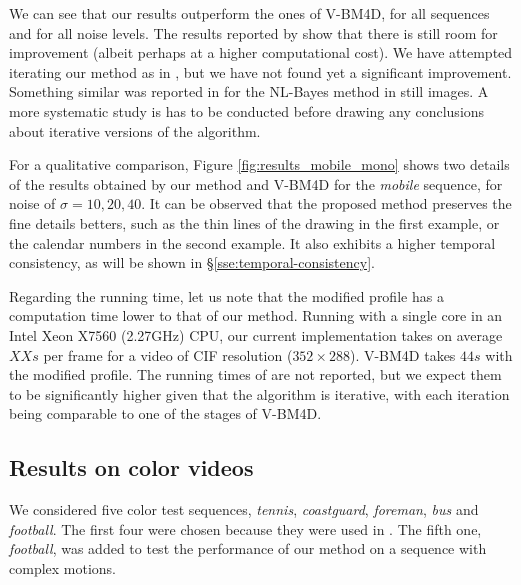 \documentclass[10pt, journal, twocolumn, final, a4paper]{IEEEtran}
\newcommand{\pcomment}[1]{}
\begin{document}
We can see that our results outperform the ones of V-BM4D, for all sequences and 
for all noise levels. The results reported by \cite{LiZhangDai2011} show that there
is still room for improvement (albeit perhaps at a higher computational cost).
%
We have attempted iterating our method as in \cite{LiZhangDai2011},
but we have not found yet a significant improvement. Something similar was
reported in \cite{Lebrun2013ipol,Lebrun2013a} for the NL-Bayes method in still
images. %
A more systematic study is has to be conducted before drawing any
conclusions about iterative versions of the algorithm.

For a qualitative comparison, Figure \ref{fig:results_mobile_mono}
shows two details of the results obtained by our method and V-BM4D for the
\emph{mobile} sequence, for noise of $\sigma = 10, 20, 40$. It can be observed
that the proposed method preserves the fine details betters, such as the thin
lines of the drawing in the first example, or the calendar numbers in the
second example. It also exhibits a higher temporal consistency, as will be
shown in \S \ref{sse:temporal-consistency}.


Regarding the running time, let us note that the modified profile has a
computation time lower to that of our method. Running with a
single core in an Intel Xeon X7560 (2.27GHz) CPU, 
our current implementation takes on average $XXs$ per frame for a video of CIF
resolution ($352\times288$). V-BM4D takes $44s$ with the modified profile.
The running times of \cite{LiZhangDai2011} are not reported, but we expect them
to be significantly higher given that the algorithm is iterative, with each iteration 
being comparable to one of the stages of V-BM4D.
\pcomment{TODO: Compute running times!!!}
\pcomment{We should include computation times for grayscale videos, instead of color}


\subsection{Results on color videos}

We considered five color test sequences, \emph{tennis}, \emph{coastguard},
\emph{foreman}, \emph{bus} and \emph{football}. The first four were chosen
because they were used in \cite{Maggioni2012}. The fifth one, \emph{football},
was added to test the performance of our method on a sequence with complex motions.
\end{document}
